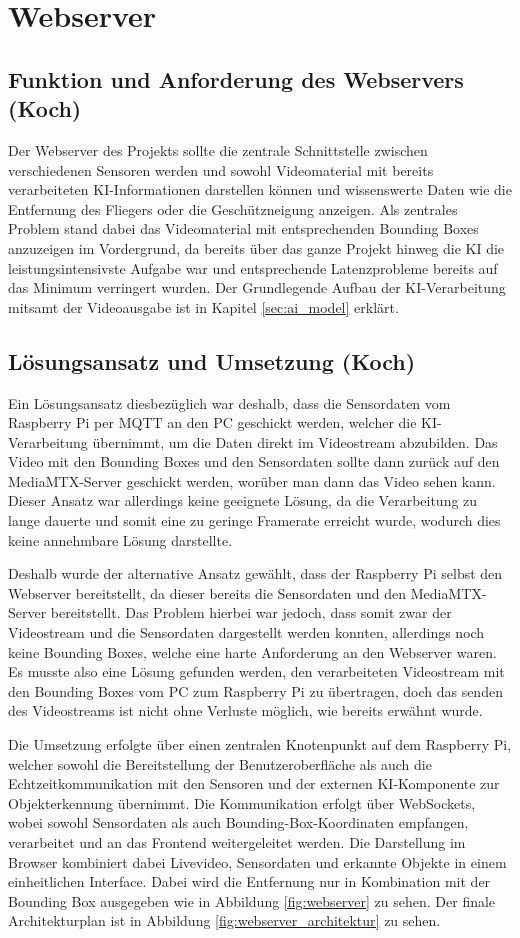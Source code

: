 \chapter{Webserver}
\label{sec:Webserver}
\section{Funktion und Anforderung des Webservers (Koch)}
Der Webserver des Projekts sollte die zentrale Schnittstelle zwischen verschiedenen Sensoren werden und sowohl Videomaterial mit bereits verarbeiteten KI-Informationen darstellen können und wissenswerte Daten wie die Entfernung des Fliegers oder die Geschützneigung anzeigen.
Als zentrales Problem stand dabei das Videomaterial mit entsprechenden Bounding Boxes anzuzeigen im Vordergrund, da bereits über das ganze Projekt hinweg die KI die leistungsintensivste Aufgabe war und entsprechende Latenzprobleme bereits auf das Minimum verringert wurden.
Der Grundlegende Aufbau der KI-Verarbeitung mitsamt der Videoausgabe ist in Kapitel \ref{sec:ai_model} erklärt.

\section{Lösungsansatz und Umsetzung (Koch)}
Ein Lösungsansatz diesbezüglich war deshalb, dass die Sensordaten vom Raspberry Pi per MQTT an den PC geschickt werden, welcher die KI-Verarbeitung übernimmt, um die Daten direkt im Videostream abzubilden.
Das Video mit den Bounding Boxes und den Sensordaten sollte dann zurück auf den MediaMTX-Server geschickt werden, worüber man dann das Video sehen kann.
Dieser Ansatz war allerdings keine geeignete Lösung, da die Verarbeitung zu lange dauerte und somit eine zu geringe Framerate erreicht wurde, wodurch dies keine annehmbare Lösung darstellte.


Deshalb wurde der alternative Ansatz gewählt, dass der Raspberry Pi selbst den Webserver bereitstellt, da dieser bereits die Sensordaten und den MediaMTX-Server bereitstellt.
Das Problem hierbei war jedoch, dass somit zwar der Videostream und die Sensordaten dargestellt werden konnten, allerdings noch keine Bounding Boxes, welche eine harte Anforderung an den Webserver waren.
Es musste also eine Lösung gefunden werden, den verarbeiteten Videostream mit den Bounding Boxes vom PC zum Raspberry Pi zu übertragen, doch das senden des Videostreams ist nicht ohne Verluste möglich, wie bereits erwähnt wurde.

Die Umsetzung erfolgte über einen zentralen Knotenpunkt auf dem Raspberry Pi, welcher sowohl die Bereitstellung der Benutzeroberfläche als auch die Echtzeitkommunikation mit den Sensoren und der externen KI-Komponente zur Objekterkennung übernimmt. Die Kommunikation erfolgt über WebSockets, wobei sowohl Sensordaten als auch Bounding-Box-Koordinaten empfangen, verarbeitet und an das Frontend weitergeleitet werden. Die Darstellung im Browser kombiniert dabei Livevideo, Sensordaten und erkannte Objekte in einem einheitlichen Interface. 
Dabei wird die Entfernung nur in Kombination mit der Bounding Box ausgegeben wie in Abbildung \ref{fig:webserver} zu sehen. Der finale Architekturplan ist in Abbildung \ref{fig:webserver_architektur} zu sehen.

